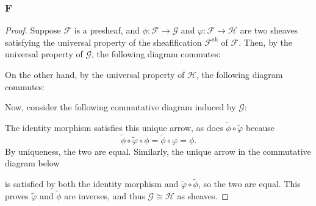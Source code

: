 \documentclass{article}
\newcommand{\fF}{\mathscr{F}}
\newcommand{\fG}{\mathscr{G}}
\newcommand{\fH}{\mathscr{H}}
\begin{document}
\subsubsection{F}\label{2.4.F}
\begin{proof}
    Suppose $\fF$ is a presheaf, and $\phi:\fF\to \fG$ and $\varphi:\fF\to \fH$ are two sheaves satisfying the universal property of the sheafification $\fF^{\text{sh}}$ of $\fF$. Then, by the universal property of $\fG$, the following diagram commutes:
    \begin{center}
    \end{center}
    On the other hand, by the universal property of $\fH$, the following diagram commutes:
    \begin{center}
    \end{center}
    Now, consider the following commutative diagram induced by $\fG$:
    \begin{center}
    \end{center}
    The identity morphism satisfies this unique arrow, as does $\tilde \phi \circ \tilde \varphi$ because
    \[
    \tilde \phi \circ \tilde \varphi \circ \phi=\tilde \phi \circ \varphi=\phi.
    \]
    By uniqueness, the two are equal. Similarly, the unique arrow in the commutative diagram below
    \begin{center}
    \end{center}
    is satisfied by both the identity morphism and $\tilde \varphi \circ \tilde \phi$, so the two are equal. This proves $\tilde \varphi$ and $\tilde \phi$ are inverses, and thus $\fG\cong \fH$ as sheaves. 
    

\end{proof}
\end{document}
